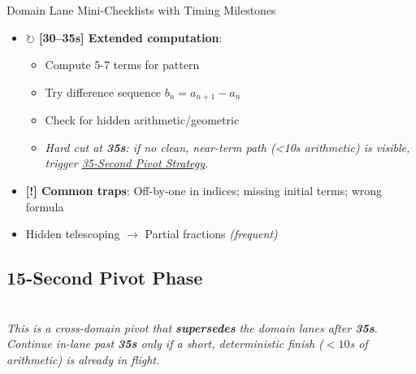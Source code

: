 \documentclass{article}
\newcommand{\timer}[1]{\textbf{\textcolor{timegreen}{#1}}}
\begin{document}
\begin{classifybox}{Domain Lane Mini-Checklists with Timing Milestones}
\begin{itemize}[nosep]
\begin{itemize}[nosep]
        \end{itemize}
      \item \textbf{$\circlearrowright$ [30--35s] Extended computation}:
        \begin{itemize}[nosep]
        \item Compute 5-7 terms for pattern
        \item Try difference sequence $b_n = a_{n+1} - a_n$
        \item Check for hidden arithmetic/geometric
        \item \emph{Hard cut at \timer{35s}: if no clean, near-term path (<10s arithmetic) is visible, trigger \hyperlink{pivot35}{35-Second Pivot Strategy}.}
        \end{itemize}
      \item \textbf{[!] Common traps}: Off-by-one in indices; missing initial terms; wrong formula
      \item {} Hidden telescoping $\rightarrow$ Partial fractions \emph{(frequent)}
      \end{itemize}
   \end{classifybox}
   
\newpage

\hypertarget{pivot35}{}
\subsection{15-Second Pivot Phase}
{\footnotesize\textcolor{timegreen}{}}\\

\textit{This is a cross-domain pivot that \textbf{supersedes} the domain lanes after \timer{35s}. 
Continue in-lane past \timer{35s} only if a short, deterministic finish (\(<10\)s of arithmetic) is already in flight.}
\end{document}
